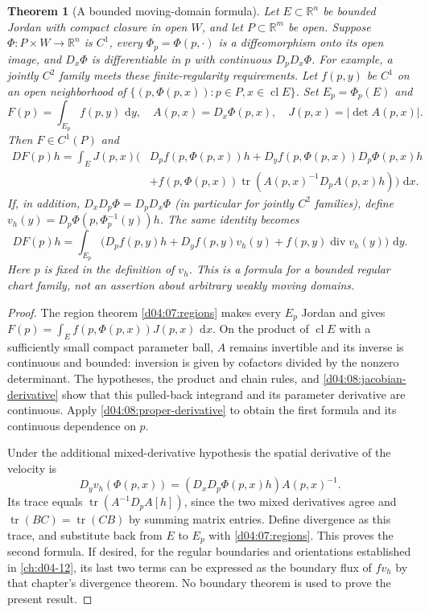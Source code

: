 \documentclass[11pt,oneside,openany]{book}
\newtheorem{theorem}{Theorem}[chapter]
\theoremstyle{definition}
\theoremstyle{remark}
\newcommand{\R}{\mathbb R}
\newcommand{\dd}{\,\mathrm d}
\DeclareMathOperator{\tr}{tr}
\DeclareMathOperator{\cl}{cl}
\begin{document}
\begin{theorem}[A bounded moving-domain formula]\label{d04:08:moving-domain}
Let $E\subset\R^n$ be bounded Jordan with compact closure in open $W$, and let $P\subset\R^m$ be open. Suppose $\Phi:P\times W\to\R^n$ is $C^1$, every $\Phi_p=\Phi(p,\cdot)$ is a diffeomorphism onto its open image, and $D_x\Phi$ is differentiable in $p$ with continuous $D_pD_x\Phi$. For example, a jointly $C^2$ family meets these finite-regularity requirements. Let $f(p,y)$ be $C^1$ on an open neighborhood of $\{(p,\Phi(p,x)):p\in P,x\in\cl E\}$. Set $E_p=\Phi_p(E)$ and
\[
 F(p)=\int_{E_p}f(p,y)\,\dd y,\quad A(p,x)=D_x\Phi(p,x),\quad J(p,x)=|\det A(p,x)|.
\]
Then $F\in C^1(P)$ and
\begin{align*}
 DF(p)h=\int_E J(p,x)\big(&D_pf(p,\Phi(p,x))h
 +D_yf(p,\Phi(p,x))D_p\Phi(p,x)h\\
 &+f(p,\Phi(p,x))\tr(A(p,x)^{-1}D_pA(p,x)h)\big)\,\dd x.
\end{align*}
If, in addition, $D_xD_p\Phi=D_pD_x\Phi$ (in particular for jointly $C^2$ families), define
$v_h(y)=D_p\Phi(p,\Phi_p^{-1}(y))h$. The same identity becomes
\[
 DF(p)h=\int_{E_p}\big(D_pf(p,y)h+D_yf(p,y)v_h(y)+f(p,y)\operatorname{div}v_h(y)\big)\,\dd y.
\]
Here $p$ is fixed in the definition of $v_h$. This is a formula for a bounded regular chart family, not an assertion about arbitrary weakly moving domains.
\end{theorem}
\begin{proof}
The region theorem \cref{d04:07:regions} makes every $E_p$ Jordan and gives
$F(p)=\int_Ef(p,\Phi(p,x))J(p,x)\,\dd x$. On the product of $\cl E$ with a sufficiently small compact parameter ball, $A$ remains invertible and its inverse is continuous and bounded: inversion is given by cofactors divided by the nonzero determinant. The hypotheses, the product and chain rules, and \cref{d04:08:jacobian-derivative} show that this pulled-back integrand and its parameter derivative are continuous. Apply \cref{d04:08:proper-derivative} to obtain the first formula and its continuous dependence on $p$.

Under the additional mixed-derivative hypothesis the spatial derivative of the velocity is
\[
 D_yv_h(\Phi(p,x))=(D_xD_p\Phi(p,x)h)A(p,x)^{-1}.
\]
Its trace equals $\tr(A^{-1}D_pA[h])$, since the two mixed derivatives agree and $\tr(BC)=\tr(CB)$ by summing matrix entries. Define divergence as this trace, and substitute back from $E$ to $E_p$ with \cref{d04:07:regions}. This proves the second formula. If desired, for the regular boundaries and orientations established in \cref{ch:d04-12}, its last two terms can be expressed as the boundary flux of $fv_h$ by that chapter's divergence theorem. No boundary theorem is used to prove the present result.
\end{proof}
\end{document}
